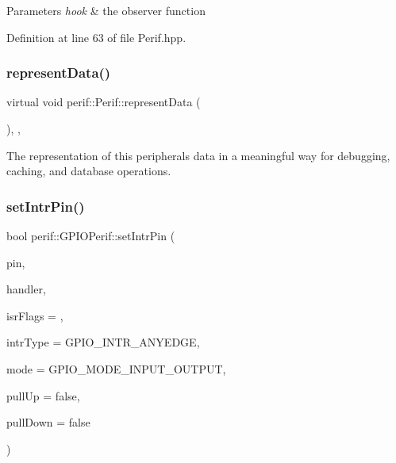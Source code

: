 \begin{DoxyParams}{Parameters}
{\em hook} & the observer function \\
\hline
\end{DoxyParams}


Definition at line 63 of file Perif.\+hpp.


\begin{DoxyCode}{0}

\end{DoxyCode}
\mbox{\label{classperif_1_1Perif_a556c780e9e4623aa6b7c3d167ef23e6b}} 
\subsubsection{\texorpdfstring{representData()}{representData()}}
{\footnotesize\ttfamily virtual void perif\+::\+Perif\+::represent\+Data (\begin{DoxyParamCaption}{ }\end{DoxyParamCaption})\hspace{0.3cm}{\ttfamily [protected]}, {}, {\ttfamily [inherited]}}

The representation of this peripheral\textquotesingle{}s data in a meaningful way for debugging, caching, and database operations. \mbox{\label{classperif_1_1GPIOPerif_a9e1f4a1d4aa01d0bc01d9a371a52dd5c}} 
\subsubsection{\texorpdfstring{setIntrPin()}{setIntrPin()}}
{\footnotesize\ttfamily bool perif\+::\+G\+P\+I\+O\+Perif\+::set\+Intr\+Pin (\begin{DoxyParamCaption}\item[{uint8\+\_\+t}]{pin,  }\item[{gpio\+Func \&\&}]{handler,  }\item[{uint8\+\_\+t}]{isr\+Flags = {},  }\item[{gpio\+\_\+int\+\_\+type\+\_\+t}]{intr\+Type = {\ttfamily GPIO\+\_\+INTR\+\_\+ANYEDGE},  }\item[{gpio\+\_\+mode\+\_\+t}]{mode = {\ttfamily GPIO\+\_\+MODE\+\_\+INPUT\+\_\+OUTPUT},  }\item[{bool}]{pull\+Up = {\ttfamily false},  }\item[{bool}]{pull\+Down = {\ttfamily false} }\end{DoxyParamCaption})\hspace{0.3cm}{\ttfamily [inline]}}

